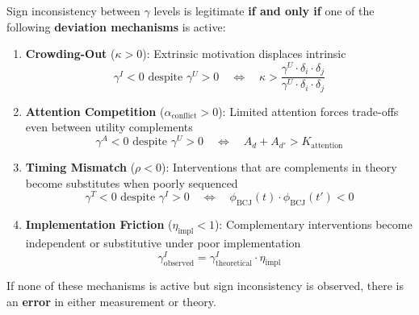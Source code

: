 \begin{theorem}
\label{thm:gtc-violation}

Sign inconsistency between $\gamma$ levels is legitimate \textbf{if and only if}
one of the following \textbf{deviation mechanisms} is active:

\begin{enumerate}
    \item \textbf{Crowding-Out} ($\kappa > 0$): Extrinsic motivation displaces intrinsic
    \begin{equation}
    \gamma^I < 0 \text{ despite } \gamma^U > 0 \quad \Leftrightarrow \quad \kappa > \frac{\gamma^U \cdot \delta_i \cdot \delta_j}{\gamma^U \cdot \delta_i \cdot \delta_j}
    \end{equation}

    \item \textbf{Attention Competition} ($\alpha_{\text{conflict}} > 0$): Limited attention
    forces trade-offs even between utility complements
    \begin{equation}
    \gamma^A < 0 \text{ despite } \gamma^U > 0 \quad \Leftrightarrow \quad A_d + A_{d'} > K_{\text{attention}}
    \end{equation}

    \item \textbf{Timing Mismatch} ($\rho < 0$): Interventions that are complements
    in theory become substitutes when poorly sequenced
    \begin{equation}
    \gamma^T < 0 \text{ despite } \gamma^I > 0 \quad \Leftrightarrow \quad \phi_{\text{BCJ}}(t) \cdot \phi_{\text{BCJ}}(t') < 0
    \end{equation}

    \item \textbf{Implementation Friction} ($\eta_{\text{impl}} < 1$): Complementary
    interventions become independent or substitutive under poor implementation
    \begin{equation}
    \gamma^I_{\text{observed}} = \gamma^I_{\text{theoretical}} \cdot \eta_{\text{impl}}
    \end{equation}
\end{enumerate}

If none of these mechanisms is active but sign inconsistency is observed,
there is an \textbf{error} in either measurement or theory.

\end{theorem}

